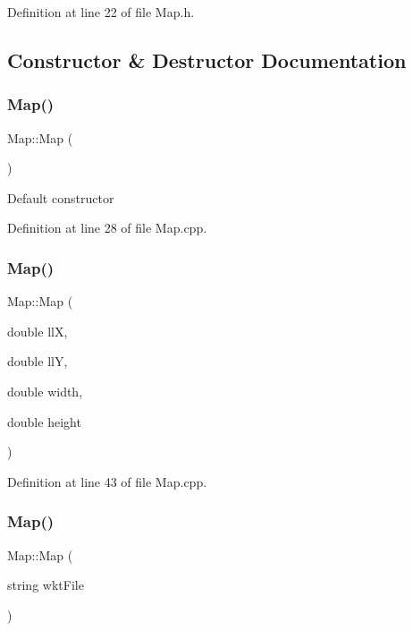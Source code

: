 Definition at line 22 of file Map.\+h.



\subsection{Constructor \& Destructor Documentation}
\mbox{\label{class_map_a0f5ad0fd4563497b4214038cbca8b582}} 
\subsubsection{Map()\hspace{0.1cm}{\footnotesize\ttfamily [1/3]}}
{\footnotesize\ttfamily Map\+::\+Map (\begin{DoxyParamCaption}{ }\end{DoxyParamCaption})}

Default constructor 

Definition at line 28 of file Map.\+cpp.

\mbox{\label{class_map_a4c9545a0252613e2a6808932fe83f9ad}} 
\subsubsection{Map()\hspace{0.1cm}{\footnotesize\ttfamily [2/3]}}
{\footnotesize\ttfamily Map\+::\+Map (\begin{DoxyParamCaption}\item[{double}]{llX,  }\item[{double}]{llY,  }\item[{double}]{width,  }\item[{double}]{height }\end{DoxyParamCaption})}



Definition at line 43 of file Map.\+cpp.

\mbox{\label{class_map_ab8beab7a7dce782a23db740cd7132552}} 
\subsubsection{Map()\hspace{0.1cm}{\footnotesize\ttfamily [3/3]}}
{\footnotesize\ttfamily Map\+::\+Map (\begin{DoxyParamCaption}\item[{string}]{wkt\+File }\end{DoxyParamCaption})}



